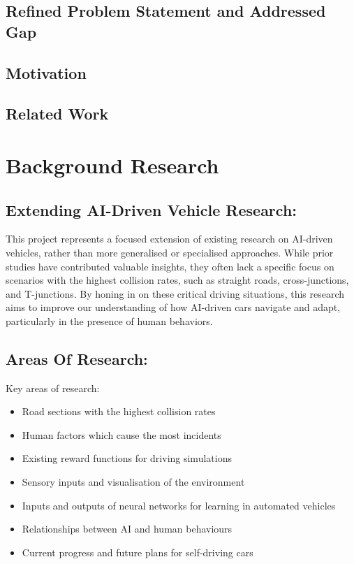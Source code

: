 \documentclass{article}
\begin{document}
\subsection{Refined Problem Statement and Addressed Gap}
\lipsum[2][1]

\subsection{Motivation}
\lipsum[2][1]

\subsection{Related Work}
\lipsum[2][1]

\section{Background Research}
\lipsum[2][1]

\subsection{Extending AI-Driven Vehicle Research:}
This project represents a focused extension of existing research on AI-driven vehicles, rather than more generalised or specialised approaches. While prior studies have contributed valuable insights, they often lack a specific focus on scenarios with the highest collision rates, such as straight roads, cross-junctions, and T-junctions. By honing in on these critical driving situations, this research aims to improve our understanding of how AI-driven cars navigate and adapt, particularly in the presence of human behaviors. 

\subsection{Areas Of Research:}
Key areas of research:
\begin{itemize}
    \item Road sections with the highest collision rates \cite{accident-types-and-causes}
    \item Human factors which cause the most incidents \cite{accident-types-and-causes} \cite{gov-crash-stats} \cite{Crash-human-causes}
    \item Existing reward functions for driving simulations \cite{Predictive-reward-function-for-ai-driving} \cite{Racing-reward-functions} \cite{Deep-RL-for-racing-driving} 
    \item Sensory inputs and visualisation of the environment \cite{General-overview-of-ai-driving}
    \item Inputs and outputs of neural networks for learning in automated vehicles \cite{Collision-avoidance-in-lane-free-traffic-neural-system} \cite{Deep-RL-for-AI-driving-general-overview}
    \item Relationships between AI and human behaviours \cite{Collision-frequency-ai-and-humans} 
    \item Current progress and future plans for self-driving cars \cite{Deep-learning-for-AI-driving}
\end{itemize}
\end{document}
